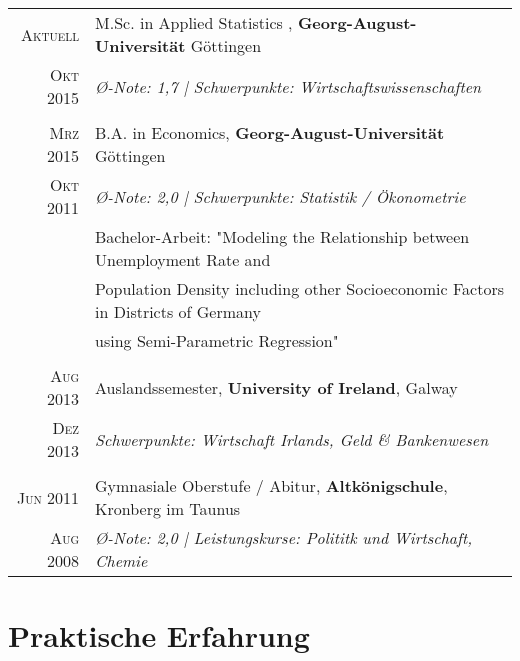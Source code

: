\documentclass[a4paper,10pt]{article} %
\begin{document}
\begin{tabular}{rl}
\textsc{Aktuell}& M.Sc. in Applied Statistics , \textbf{Georg-August-Universität} Göttingen\\
\textsc{Okt 2015}& \emph{{{\O}}-Note: 1,7 | Schwerpunkte: Wirtschaftswissenschaften}\\
&\\




\textsc{Mrz 2015}& B.A. in Economics, \textbf{Georg-August-Universität} Göttingen\\
\textsc{Okt 2011}& \emph{{{\O}}-Note: 2,0 | Schwerpunkte: Statistik / Ökonometrie}\\
&\footnotesize{Bachelor-Arbeit: "Modeling the Relationship between
Unemployment Rate and}\\
&\footnotesize{Population Density including other
Socioeconomic Factors in Districts of
Germany}\\
& \footnotesize{using Semi-Parametric Regression"} \\
&\\


\textsc{Aug 2013} & Auslandssemester, \textbf{University of Ireland}, Galway\\
\textsc{Dez 2013}& \emph{Schwerpunkte: Wirtschaft Irlands, Geld \& Bankenwesen}\\
&\\

\textsc{Jun 2011} & Gymnasiale Oberstufe / Abitur, \textbf{Altkönigschule}, Kronberg im Taunus\\
\textsc{Aug 2008}& \emph{{\O}-Note: 2,0 | Leistungskurse: Polititk und Wirtschaft, Chemie}\\

\end{tabular}


\section{Praktische Erfahrung}
\end{document}

